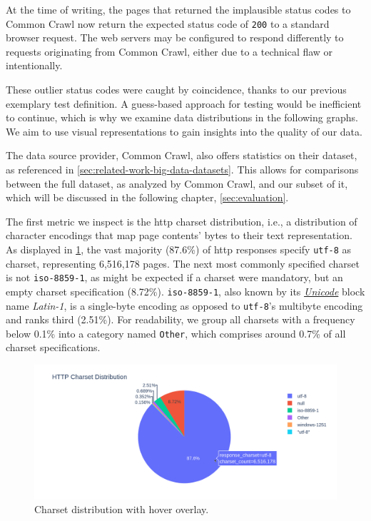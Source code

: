 At the time of writing, the pages that returned the implausible status codes to Common Crawl now return the expected status code of \texttt{200} to a standard browser request.
The web servers may be configured to respond differently to requests originating from Common Crawl, either due to a technical flaw or intentionally.

These outlier status codes were caught by coincidence, thanks to our previous exemplary test definition.
A guess-based approach for testing would be inefficient to continue, which is why we examine data distributions in the following graphs.
We aim to use visual representations to gain insights into the quality of our data.

The data source provider, Common Crawl, also offers statistics on their dataset, as referenced in \cref{sec:related-work-big-data-datasets}.
This allows for comparisons between the full dataset, as analyzed by Common Crawl, and our subset of it, which will be discussed in the following chapter, \cref{sec:evaluation}.

The first metric we inspect is the \ac{http} charset distribution, i.e., a distribution of character encodings that map page contents' bytes to their text representation.
As displayed in \cref{fig:analysis-dataset-chart_source_charset_pie}, the vast majority (87.6\%) of \ac{http} responses specify \texttt{utf-8} as charset, representing 6,516,178 pages.
The next most commonly specified charset is not \texttt{iso-8859-1}, as might be expected if a charset were mandatory, but an empty charset specification (8.72\%).
\texttt{iso-8859-1}, also known by its \href{https://home.unicode.org/}{\textit{Unicode}} block name \textit{Latin-1}, is a single-byte encoding as opposed to \texttt{utf-8}'s multibyte encoding and ranks third (2.51\%).
For readability, we group all charsets with a frequency below 0.1\% into a category named \texttt{Other}, which comprises around 0.7\% of all charset specifications.

\begin{figure}[H]
    \centering
    \includegraphics[width=\textwidth]{figures/charts/large/chart_source_charset_pie.png}
    \caption{Charset distribution with hover overlay.}
    \label{fig:analysis-dataset-chart_source_charset_pie}
\end{figure}

